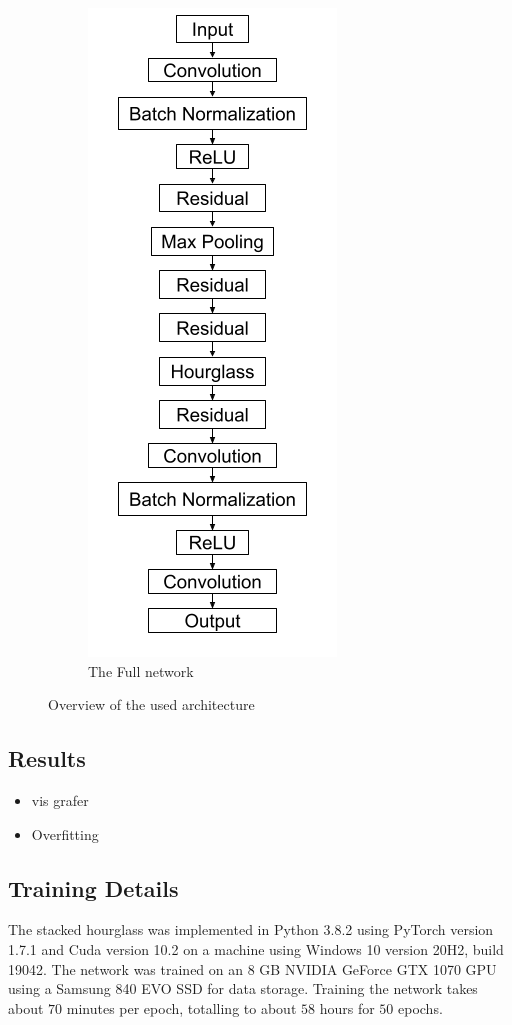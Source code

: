 \documentclass[./main.tex]{subfiles}
\begin{document}
\begin{figure}[t]
\begin{subfigure}{5 cm}
        \centering
        \includegraphics[width = 4 cm]{entities/SHG_drawing.png}
        \caption{The Full network}
    \end{subfigure}
    \caption{Overview of the used architecture}
    \label{fig:architecture}
\end{figure}

\clearpage

\subsection{Results}
\begin{itemize}
    \item vis grafer
    \item Overfitting
\end{itemize}

\subsection{Training Details}
The stacked hourglass was implemented in Python 3.8.2 using PyTorch version 1.7.1 and Cuda version 10.2 on a machine using Windows 10 version 20H2, build 19042. The network was trained on an 8 GB NVIDIA GeForce GTX 1070 GPU using a Samsung 840 EVO SSD for data storage. Training the network takes about $70$ minutes per epoch, totalling to about $58$ hours for $50$ epochs.
\end{document}
